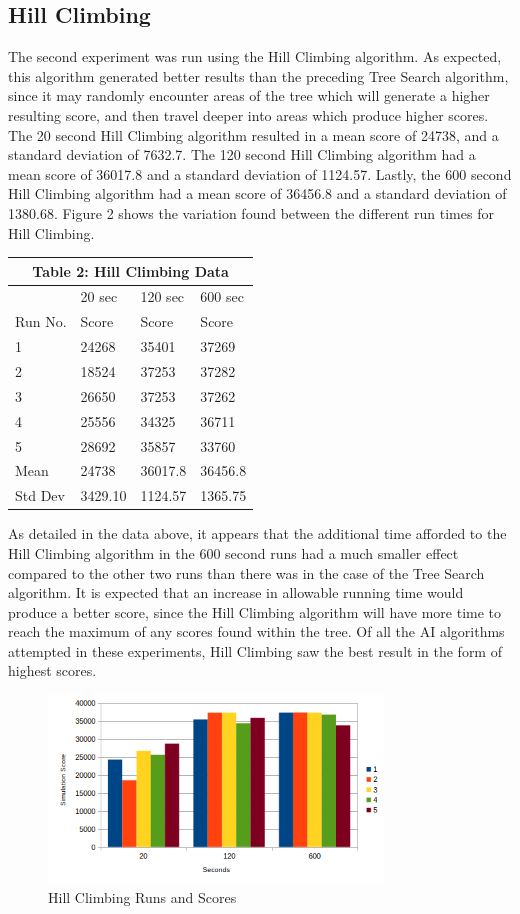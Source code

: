 \documentclass[10pt, twocolumn]{article}
\begin{document}
\subsection{Hill Climbing}
The second experiment was run using the Hill Climbing algorithm. As expected, this algorithm
generated better results than the preceding Tree Search algorithm, since it may randomly encounter
areas of the tree which will generate a higher resulting score, and then travel deeper into areas
which produce higher scores. The 20 second Hill Climbing algorithm resulted in a mean score of 24738,
and a standard deviation of 7632.7. The 120 second Hill Climbing algorithm had a mean
score of 36017.8 and a standard deviation of 1124.57. Lastly, the 600 second Hill Climbing algorithm
had a mean score of 36456.8 and a standard deviation of 1380.68. Figure 2 shows the variation found between
the different run times for Hill Climbing.

\bigbreak
\begin{tabular}{ |p{1.3cm}||p{1.3cm}|p{1.3cm}|p{1.3cm}|  }
 \hline
 \multicolumn{4}{|c|}{Table 2: Hill Climbing Data} \\
 \hline
     &20 sec&120 sec&600 sec\\
 \hline
  Run No. & Score & Score & Score\\
 \hline
   1 & 24268 & 35401 & 37269\\
   2 & 18524 & 37253 & 37282\\
   3 & 26650 & 37253 & 37262\\
   4 & 25556 & 34325 & 36711\\
   5 & 28692 & 35857 & 33760\\
 \hline
 Mean & 24738 & 36017.8 & 36456.8\\
 \hline
 Std Dev& 3429.10 & 1124.57 & 1365.75\\
 \hline
\end{tabular}
\bigbreak

As detailed in the data above, it appears that the additional time afforded to the Hill
Climbing algorithm in the 600 second runs had a much smaller effect compared to the other two
runs than there was in the case of the Tree Search algorithm. It is expected that
an increase in allowable running time would produce a better score, since the Hill Climbing
algorithm will have more time to reach the maximum of any scores found within the tree.
Of all the AI algorithms attempted in these experiments, Hill Climbing
saw the best result in the form of highest scores.

\medskip
\begin{figure}[!ht]
\centering
\includegraphics[width=3.5in]{climbing_scores.png}
\caption{Hill Climbing Runs and Scores}
\label{fig_2}
\end{figure}
\medskip
\end{document}
